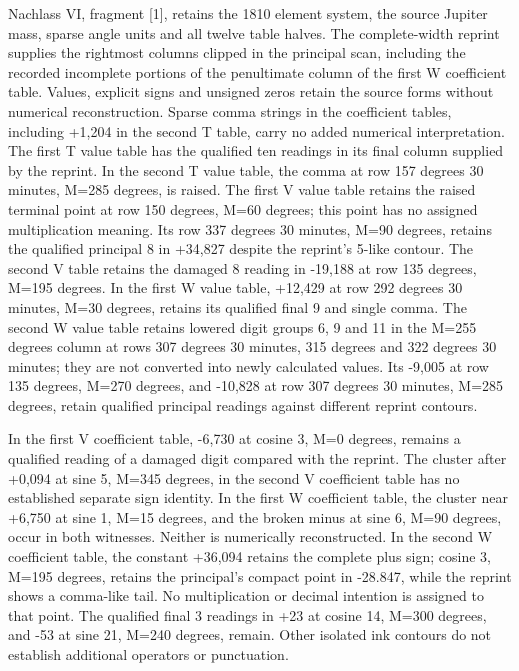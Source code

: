 Nachlass VI, fragment [1], retains the 1810 element system, the source Jupiter mass, sparse angle units and all twelve table halves. The complete-width reprint supplies the rightmost columns clipped in the principal scan, including the recorded incomplete portions of the penultimate column of the first W coefficient table. Values, explicit signs and unsigned zeros retain the source forms without numerical reconstruction. Sparse comma strings in the coefficient tables, including +1,204 in the second T table, carry no added numerical interpretation. The first T value table has the qualified ten readings in its final column supplied by the reprint. In the second T value table, the comma at row 157 degrees 30 minutes, M=285 degrees, is raised. The first V value table retains the raised terminal point at row 150 degrees, M=60 degrees; this point has no assigned multiplication meaning. Its row 337 degrees 30 minutes, M=90 degrees, retains the qualified principal 8 in +34,827 despite the reprint's 5-like contour. The second V table retains the damaged 8 reading in -19,188 at row 135 degrees, M=195 degrees. In the first W value table, +12,429 at row 292 degrees 30 minutes, M=30 degrees, retains its qualified final 9 and single comma. The second W value table retains lowered digit groups 6, 9 and 11 in the M=255 degrees column at rows 307 degrees 30 minutes, 315 degrees and 322 degrees 30 minutes; they are not converted into newly calculated values. Its -9,005 at row 135 degrees, M=270 degrees, and -10,828 at row 307 degrees 30 minutes, M=285 degrees, retain qualified principal readings against different reprint contours.

In the first V coefficient table, -6,730 at cosine 3, M=0 degrees, remains a qualified reading of a damaged digit compared with the reprint. The cluster after +0,094 at sine 5, M=345 degrees, in the second V coefficient table has no established separate sign identity. In the first W coefficient table, the cluster near +6,750 at sine 1, M=15 degrees, and the broken minus at sine 6, M=90 degrees, occur in both witnesses. Neither is numerically reconstructed. In the second W coefficient table, the constant +36,094 retains the complete plus sign; cosine 3, M=195 degrees, retains the principal's compact point in -28.847, while the reprint shows a comma-like tail. No multiplication or decimal intention is assigned to that point. The qualified final 3 readings in +23 at cosine 14, M=300 degrees, and -53 at sine 21, M=240 degrees, remain. Other isolated ink contours do not establish additional operators or punctuation.

